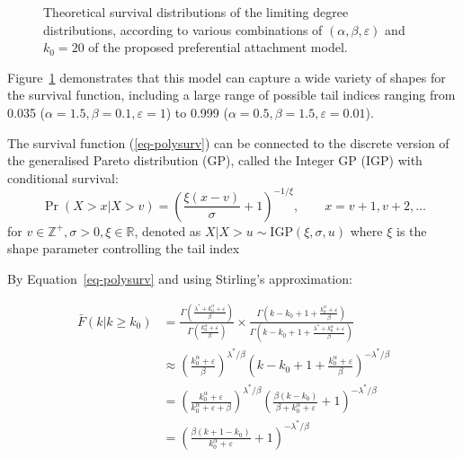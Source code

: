 \documentclass[
  sn-basic,
]{sn-jnl}
\theoremstyle{plain}
\theoremstyle{plain}
\theoremstyle{remark}
\begin{document}
\begin{figure}


\caption{\label{fig-polylinsurv}Theoretical survival distributions of
the limiting degree distributions, according to various combinations of
\((\alpha, \beta, \varepsilon)\) and \(k_0=20\) of the proposed
preferential attachment model.}

\end{figure}%

Figure~\ref{fig-polylinsurv} demonstrates that this model can capture a
wide variety of shapes for the survival function, including a large
range of possible tail indices ranging from 0.035
(\(\alpha=1.5, \beta=0.1, \varepsilon=1\)) to 0.999
(\(\alpha=0.5, \beta=1.5, \varepsilon=0.01\)).

The survival function (\ref{eq-polysurv}) can be connected to the
discrete version of the generalised Pareto distribution (GP), called the
Integer GP (IGP) \citep{Rohrbeck_2018} with conditional survival: \[
\Pr(X> x|X> v) = \left(\frac{\xi(x-v)}{\sigma} + 1\right)^{-1/\xi},\qquad x=v+1,v+2,\ldots
\] for \(v\in\mathbb Z^+, \sigma>0,\xi\in \mathbb R\), denoted as
\(X|X>u \sim  \mathrm {IGP}(\xi, \sigma, u)\) where \(\xi\) is the shape
parameter controlling the tail index

By Equation~\ref{eq-polysurv} and using Stirling's approximation:

\begin{align*}
\bar F(k|k\ge k_0) &= \frac{\Gamma\left(\frac{\lambda^* + k_0^\alpha + \varepsilon}{\beta}\right)}{\Gamma\left(\frac{k_0^\alpha + \varepsilon}{\beta}\right)}\times\frac{\Gamma\left(k-k_0  +1 + \frac{k_0^\alpha + \varepsilon}{\beta}\right)}{\Gamma\left(k-k_0  +1 + \frac{\lambda^*+ k_0^\alpha + \varepsilon}{\beta}\right)}\\
&\approx\left(\frac{k_0^\alpha+\varepsilon}{\beta}\right)^{\lambda^*/\beta}\left(k-k_0+1+\frac{k_0^\alpha + \varepsilon}{\beta}\right)^{-\lambda^*/\beta}\\
&=\left(\frac{k_0^\alpha+\varepsilon}{k_0^\alpha+\varepsilon + \beta}\right)^{\lambda^*/\beta}\left(\frac{\beta(k-k_0)}{\beta + k_0^\alpha+\varepsilon} + 1\right)^{-\lambda^*/\beta}\\
&=\left(\frac{\beta(k+1-k_0)}{k_0^{\alpha}+\varepsilon} + 1\right)^{-\lambda^{*}/\beta}
\end{align*}
\end{document}
